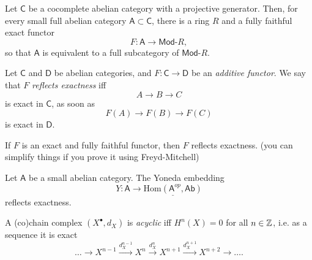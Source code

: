 \begin{thm}[]
	Let $\mathsf{C}$ be a cocomplete abelian category with a projective generator.
	Then, for every small full abelian category $\mathsf{A} \subset \mathsf{C}$,
	there is a ring $R$ and a fully faithful exact functor
	\begin{equation}
	F: \mathsf{A} \to \mathsf{Mod}\text{-}R
	,\end{equation} 
	so that $\mathsf{A}$ is equivalent to a full subcategory of $\mathsf{Mod}\text{-}R$.
\end{thm}

\begin{defn}
	Let $\mathsf{C}$ and $\mathsf{D}$ be abelian categories, and
	$F\colon \mathsf{C} \to \mathsf{D}$ be an {\em additive functor}.
	We say that $F$ {\em reflects exactness} iff
	\begin{equation}
	A \to B \to C
	\end{equation} 
	is exact in $\mathsf{C}$, as soon as
	\begin{equation}
		F(A) \to F(B) \to F(C)
	\end{equation} 
	is exact in $\mathsf{D}$.
\end{defn}

\begin{lem}
	If $F$ is an exact and fully faithful functor,
	then $F$ reflects exactness.
	(you can simplify things if you prove it using Freyd-Mitchell)
\end{lem} 

\begin{prop}
	Let $\mathsf{A}$ be a small abelian category.
	The Yoneda embedding
	\begin{equation}
		Y\colon \mathsf{A} \to \underline{\mathrm{Hom}\left( \mathsf{A}^{op}, \mathsf{Ab} \right)}
	\end{equation} 
	reflects exactness.
\end{prop} 

\begin{defn}
	A (co)chain complex $\left( X^{\bullet}, d_{X} \right)$ is {\em acyclic} iff 
	$H^n(X) = 0$ for all $n \in \mathbb{Z}$, i.e. as a sequence it is exact
	\begin{equation}
	\ldots \to X^{n-1} \xrightarrow{d_X^{n-1}} X^n \xrightarrow{d_X^n} 
	X^{n+1} \xrightarrow{d_X^{n+1}} X^{n+2} \to \ldots
	.\end{equation} 
\end{defn}
